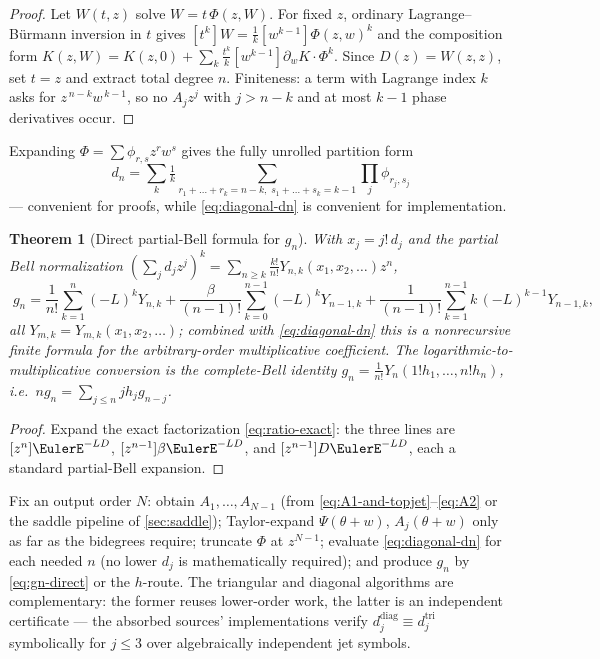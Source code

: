 \documentclass[11pt,oneside]{article}
\numberwithin{equation}{section}
\newtheorem{theorem}{Theorem}[section]
\theoremstyle{definition}
\theoremstyle{remark}
\newcommand{\Bell}{Y}
\begin{document}
\begin{proof}
Let $W(t,z)$ solve $W=t\,\Phi(z,W)$.  For fixed $z$, ordinary
Lagrange--B\"urmann inversion in $t$ gives
$[t^{k}]W=\tfrac1k[w^{k-1}]\Phi(z,w)^{k}$ and the composition form
$K(z,W)=K(z,0)+\sum_k\tfrac{t^{k}}k[w^{k-1}]\partial_wK\cdot\Phi^{k}$.
Since $D(z)=W(z,z)$, set $t=z$ and extract total degree $n$.
Finiteness: a term with Lagrange index $k$ asks for
$z^{\,n-k}w^{\,k-1}$, so no $A_jz^{j}$ with $j>n-k$ and at most $k-1$
phase derivatives occur.
\end{proof}

Expanding $\Phi=\sum\phi_{r,s}z^{r}w^{s}$ gives the fully unrolled
partition form
\[
 d_n=\sum_k\tfrac1k
 \sum_{r_1+\dots+r_k=n-k,\;s_1+\dots+s_k=k-1}
 \prod_j\phi_{r_j,s_j}
\]
--- convenient for proofs, while
\eqref{eq:diagonal-dn} is convenient for implementation.

\begin{theorem}[Direct partial-Bell formula for $g_n$]
\label{thm:direct-gn}
With $x_j=j!\,d_j$ and the partial Bell normalization
$(\sum_jd_jz^{j})^{k}
=\sum_{n\ge k}\frac{k!}{n!}\Bell_{n,k}(x_1,x_2,\dots)z^{n}$,
\begin{equation}
 \boxed{\;
 g_n=\frac1{n!}\sum_{k=1}^{n}(-L)^{k}\Bell_{n,k}
 +\frac{\beta}{(n-1)!}\sum_{k=0}^{n-1}(-L)^{k}\Bell_{n-1,k}
 +\frac1{(n-1)!}\sum_{k=1}^{n-1}k\,(-L)^{k-1}\Bell_{n-1,k},
 \;}
 \label{eq:gn-direct}
\end{equation}
all $\Bell_{m,k}=\Bell_{m,k}(x_1,x_2,\dots)$; combined with
\eqref{eq:diagonal-dn} this is a nonrecursive finite formula for the
arbitrary-order multiplicative coefficient.  The
logarithmic-to-multiplicative conversion is the complete-Bell
identity $g_n=\frac1{n!}\Bell_n(1!h_1,\dots,n!h_n)$, i.e.\
$ng_n=\sum_{j\le n}jh_jg_{n-j}$.
\end{theorem}

\begin{proof}
Expand the exact factorization \eqref{eq:ratio-exact}: the three
lines are $[z^{n}]\EulerE^{-LD}$, $[z^{n-1}]\beta\EulerE^{-LD}$, and
$[z^{n-1}]D\EulerE^{-LD}$, each a standard partial-Bell expansion.
\end{proof}

\begin{algorithm}
\label{alg:generation}
Fix an output order $N$: obtain $A_1,\dots,A_{N-1}$ (from
\eqref{eq:A1-and-topjet}--\eqref{eq:A2} or the saddle pipeline of
\cref{sec:saddle}); Taylor-expand $\Psi(\theta+w)$, $A_j(\theta+w)$
only as far as the bidegrees require; truncate $\Phi$ at
$z^{N-1}$; evaluate \eqref{eq:diagonal-dn} for each needed $n$
(no lower $d_j$ is mathematically required); and produce $g_n$ by
\eqref{eq:gn-direct} or the $h$-route.  The triangular and diagonal
algorithms are complementary: the former reuses lower-order work, the
latter is an independent certificate --- the absorbed sources'
implementations verify
$d^{\mathrm{diag}}_j\equiv d^{\mathrm{tri}}_j$ symbolically for
$j\le3$ over algebraically independent jet symbols.
\end{algorithm}
\end{document}
